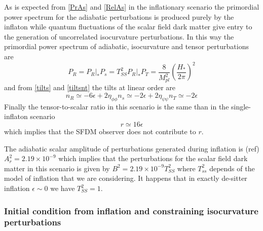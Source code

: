 \documentclass[a4paper,fleqn,usenatbib,useAMS]{mnras}
\begin{document}
As is expected from \eqref{PrAs} and \eqref{RelAs} in the inflationary scenario the primordial power spectrum for the adiabatic perturbations is produced purely by the inflaton while quantum fluctuations of the scalar field dark matter give entry to the generation of uncorrelated isocurvature perturbations. In this way the primordial power spectrum of adiabatic, isocurvature and tensor perturbations are
\begin{subequations}
\begin{equation}
P_R=P_R|_*
\end{equation}
\begin{equation}\label{PS1}
P_s=T_{SS}^2 P_R|_*
\end{equation}
\begin{equation}
P_T=\frac{8}{M_{pl}^2}\left(\frac{H_*}{2\pi}\right)^2
\end{equation}
\end{subequations}
and from \eqref{tilts} and \eqref{tiltsnt} the tilts at linear order are
\begin{subequations}
\begin{equation}
n_R\simeq-6\epsilon+2\eta_{\phi\phi}
\end{equation}
\begin{equation}
n_s\simeq-2\epsilon+2\eta_{\psi\psi}
\end{equation}
\begin{equation}
n_T\simeq -2\epsilon
\end{equation}
\end{subequations}
Finally the tensor-to-scalar ratio in this scenario is the same than in the single-inflaton scenario
\begin{equation}
r\simeq 16\epsilon
\end{equation}
which implies that the SFDM observer does not contribute to $r$.

The adiabatic scalar amplitude of perturbations generated during inflation is (ref) 
$A_r^2=2.19\times 10^{-9}
$ which implies that the perturbations for the scalar field dark matter in this scenario is given by $B^2=2.19\times 10^{-9}T_{SS}^2$ where $T_{ss}^2$ depends of the model of inflation that we are considering. It happens that in exactly de-sitter inflation $\epsilon\sim 0$ we have $T_{SS}^2=1$. 

\subsubsection{Initial condition from inflation and constraining isocurvature perturbations}
\end{document}
